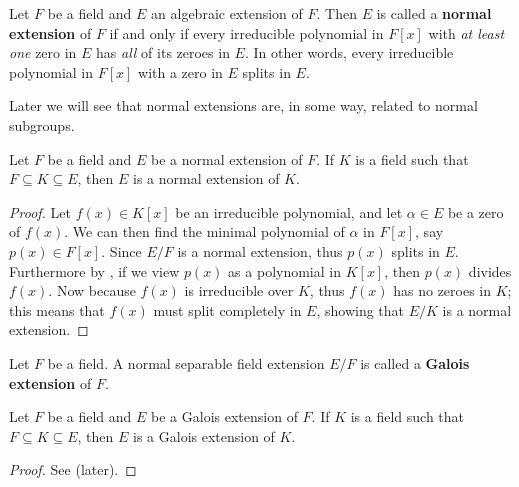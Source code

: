 \begin{definition}
    Let $F$ be a field and $E$ an algebraic extension of $F$. Then $E$ is called a \textbf{normal extension} of $F$ if and only if every irreducible polynomial in $F[x]$ with \textit{at least one} zero in $E$ has \textit{all} of its zeroes in $E$. In other words, every irreducible polynomial in $F[x]$ with a zero in $E$ splits in $E$.
\end{definition}

Later we will see that normal extensions are, in some way, related to normal subgroups.

\begin{proposition}\label{prop-intermediate-field-of-normal-extension-is-normal-extension}
    Let $F$ be a field and $E$ be a normal extension of $F$. If $K$ is a field such that $F \subseteq K \subseteq E$, then $E$ is a normal extension of $K$.
\end{proposition}
\begin{proof}
    Let $f(x) \in K[x]$ be an irreducible polynomial, and let $\alpha \in E$ be a zero of $f(x)$. We can then find the minimal polynomial of $\alpha$ in $F[x]$, say $p(x) \in F[x]$. Since $E/F$ is a normal extension, thus $p(x)$ splits in $E$. Furthermore by , if we view $p(x)$ as a polynomial in $K[x]$, then $p(x)$ divides $f(x)$. Now because $f(x)$ is irreducible over $K$, thus $f(x)$ has no zeroes in $K$; this means that $f(x)$ must split completely in $E$, showing that $E/K$ is a normal extension.
\end{proof}

\begin{definition}
    Let $F$ be a field. A normal separable field extension $E/F$ is called a \textbf{Galois extension} of $F$.
\end{definition}

\begin{proposition}\label{prop-intermediate-field-of-galois-extension-is-galois-extension}
    Let $F$ be a field and $E$ be a Galois extension of $F$. If $K$ is a field such that $F \subseteq K \subseteq E$, then $E$ is a Galois extension of $K$.
\end{proposition}
\begin{proof}
    See  (later).
\end{proof}

